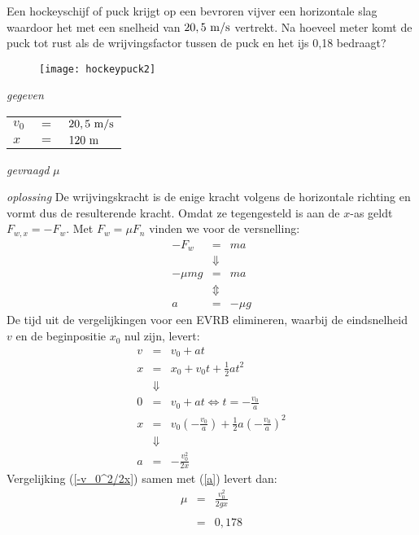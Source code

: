 
\begin{exercise}

 Een hockeyschijf of puck krijgt op een bevroren vijver een horizontale slag waardoor het met een snelheid van $20,5~\rm m/s$ vertrekt. Na hoeveel meter komt de puck tot rust als de wrijvingsfactor tussen de puck en het ijs 0,18 bedraagt? %
\begin{oplossing}
\begin{figure}[h]
\begin{center}
\texttt{[image: hockeypuck2]}
\end{center}
\end{figure}
\newline
\item [\textit{gegeven}]
\begin{tabular}[t]{lcl}
$v_0$ &$=$& $20,5~\rm m/s$\\
$x$ &$=$& $120~\rm m$\\
\end{tabular}
\item [\textit{gevraagd}]
$\mu$
\item [\textit{oplossing}]
De wrijvingskracht is de enige kracht volgens de horizontale
richting en vormt dus de resulterende kracht. Omdat ze tegengesteld
is aan de $x$-as geldt $F_{w,x}=-F_w$. Met $F_w=\mu F_n$ vinden we
voor de versnelling:
\begin{eqnarray}
-F_w &=& ma\nonumber\\
&\Downarrow& \nonumber\\
-\mu mg &=&ma\nonumber\\
&\Updownarrow& \nonumber\\
a &=& -\mu g\label{a}
\end{eqnarray}
De tijd uit de vergelijkingen voor een EVRB elimineren, waarbij de
eindsnelheid $v$ en de beginpositie $x_0$ nul zijn, levert:
\begin{eqnarray}
v&=&v_0+at\nonumber\\
x&=&x_0+v_0t+\frac{1}{2}at^2\nonumber\\
&\Downarrow&\nonumber\\
0&=&v_0+at\Leftrightarrow t=-\frac{v_0}{a}\nonumber\\
x&=&v_0\left(-\frac{v_0}{a}\right)+\frac{1}{2}a\left(-\frac{v_0}{a}\right)^2\nonumber\\
&\Downarrow&\nonumber\\
a&=&-\frac{v_0^2}{2x}\label{-v_0^2/2x}
\end{eqnarray}
Vergelijking (\ref{-v_0^2/2x}) samen met (\ref{a}) levert dan:
\begin{eqnarray}
\mu &=& \frac{v_0^2}{2gx}\label{remvgl}\\
&&\nonumber\\
&=& 0,178\nonumber
\end{eqnarray}
\end{oplossing}

\end{exercise}
